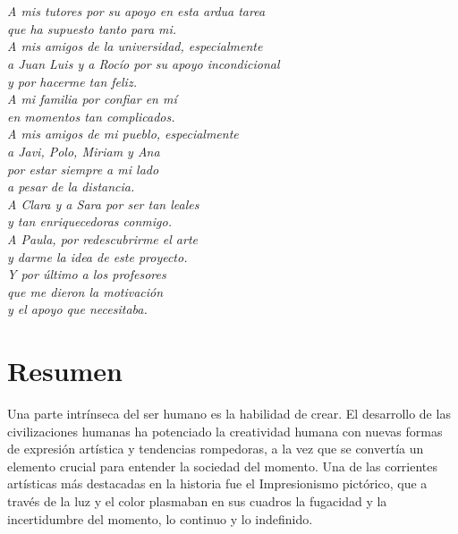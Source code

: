 \documentclass[a4paper]{report}
\newcommand\paginablanco{%
    \null
    \thispagestyle{empty}%
    \newpage}
\begin{document}
\chapter*{}
\thispagestyle{empty}
\begin{flushright}
\textit{A mis tutores por su apoyo en esta ardua tarea \\
que ha supuesto tanto para mi. \\
A mis amigos de la universidad, especialmente \\
a Juan Luis y a Rocío por su apoyo incondicional \\
y por hacerme tan feliz. \\
A mi familia por confiar en mí \\
en momentos tan complicados. \\
A mis amigos de mi pueblo, especialmente  \\
a Javi, Polo, Miriam y Ana \\
por estar siempre a mi lado \\
a pesar de la distancia. \\
A Clara y a Sara por ser tan leales \\
y tan enriquecedoras conmigo. \\
A Paula, por redescubrirme el arte \\
y darme la idea de este proyecto. \\
Y por último a los profesores \\
que me dieron la motivación \\
y el apoyo que necesitaba.}
\end{flushright}

\newpage
\paginablanco{}

\chapter*{Resumen} %
Una parte intrínseca del ser humano es la habilidad de crear. El desarrollo de las civilizaciones humanas ha potenciado la creatividad humana con nuevas formas de expresión artística y tendencias rompedoras, a la vez que se convertía un elemento crucial para entender la sociedad del momento. Una de las corrientes artísticas más destacadas en la historia fue el Impresionismo pictórico, que a través de la luz y el color plasmaban en sus cuadros la fugacidad y la incertidumbre del momento, lo continuo y lo indefinido. \newline
\end{document}
